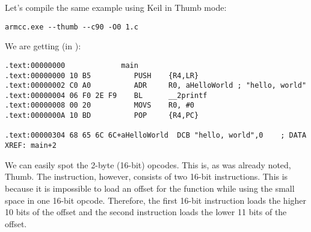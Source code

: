 \subsectionold{\NonOptimizingKeilVI (\ThumbMode)}

Let's compile the same example using Keil in Thumb mode:

\begin{lstlisting}
armcc.exe --thumb --c90 -O0 1.c 
\end{lstlisting}

We are getting (in \IDA):

\begin{lstlisting}[caption=\NonOptimizingKeilVI (\ThumbMode) + \IDA]
.text:00000000             main
.text:00000000 10 B5          PUSH    {R4,LR}
.text:00000002 C0 A0          ADR     R0, aHelloWorld ; "hello, world"
.text:00000004 06 F0 2E F9    BL      __2printf
.text:00000008 00 20          MOVS    R0, #0
.text:0000000A 10 BD          POP     {R4,PC}

.text:00000304 68 65 6C 6C+aHelloWorld  DCB "hello, world",0    ; DATA XREF: main+2
\end{lstlisting}

We can easily spot the 2-byte (16-bit) opcodes. This is, as was already noted, Thumb.
The  instruction, however, consists of two 16-bit instructions.
This is because it is impossible to load an offset for the \printf function while using the small space in one 16-bit opcode.
Therefore, the first 16-bit instruction loads the higher 10 bits of the offset and the second instruction loads 
the lower 11 bits of the offset.


